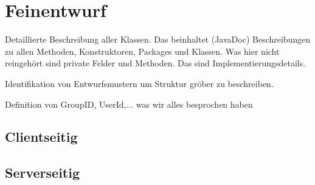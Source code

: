 \section{Feinentwurf}
Detaillierte Beschreibung aller Klassen. Das beinhaltet (JavaDoc) Beschreibungen zu allen Methoden, Konstruktoren, Packages und Klassen. Was hier nicht reingehört sind private Felder und Methoden. Das sind Implementierungsdetails.

Identifikation von Entwurfsmustern um Struktur gröber zu beschreiben.

Definition von GroupID, UserId,... was wir alles besprochen haben

\subsection{Clientseitig}




\subsection{Serverseitig}

